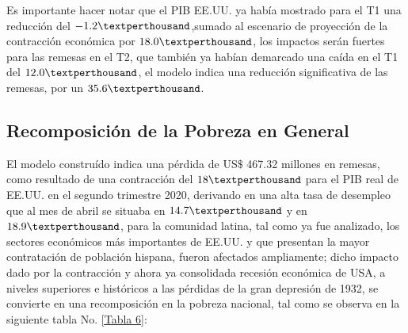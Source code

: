 Es importante hacer notar que el PIB EE.UU. ya había mostrado para el T1 una reducción del $-1.2 \textperthousand$,sumado al escenario de proyección de la contracción económica por $18.0 \textperthousand$, los impactos serán fuertes para las remesas en el T2, que también ya habían demarcado una caída en el T1 del $12.0 \textperthousand$, el modelo indica una reducción significativa de las remesas, por un $35.6 \textperthousand$.

\newpage
\subsection{Recomposición de la Pobreza en General}

El modelo construído indica una pérdida de US$\$$ 467.32 millones en remesas, como resultado de una contracción del  $18\textperthousand$ para el PIB real de EE.UU. en el segundo trimestre 2020, derivando en una alta tasa de desempleo que al mes de abril se situaba en $14.7 \textperthousand$ y en $18.9 \textperthousand$, para la comunidad latina, tal como ya fue analizado, los sectores económicos más importantes de EE.UU. y que presentan la mayor contratación de población hispana, fueron afectados ampliamente; dicho impacto dado por la contracción y ahora ya consolidada recesión económica de USA, a niveles  superiores e históricos a las pérdidas de la gran depresión de 1932, se convierte en una recomposición en la pobreza nacional, tal como se observa en la siguiente tabla No. \eqref{Tabla 6}: 

